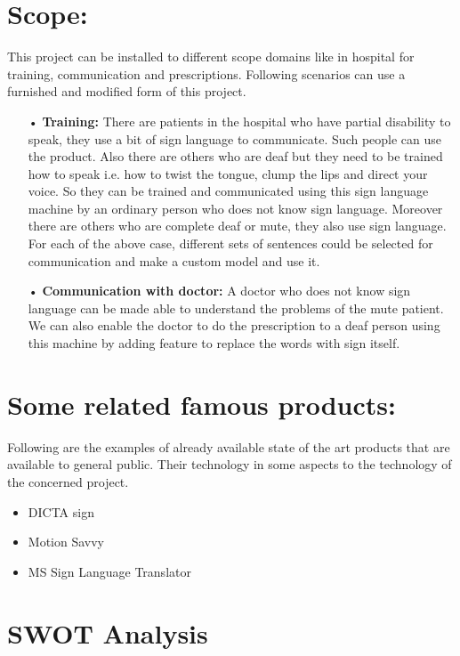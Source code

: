 \section{Scope:}
This project can be installed to different scope domains like in hospital for training, communication and prescriptions. Following scenarios can use a furnished and modified form of this project.
\begin{itemize}
\item[•]\textbf{	Training:}\newline
There are patients in the hospital who have partial disability to speak, they use a bit of sign language to communicate. Such people can use the product. Also there are others who are deaf but they need to be trained how to speak i.e. how to twist the tongue, clump the lips and direct your voice. So they can be trained and communicated using this sign language machine by an ordinary person who does not know sign language. Moreover there are others who are complete deaf or mute, they also use sign language. For each of the above case, different sets of sentences could be selected for communication and make a custom model and use it.


	

\item[•]\textbf{	Communication with doctor:}\newline 
A doctor who does not know sign language can be made able to understand the problems of the mute patient. We can also enable the doctor to do the prescription to a deaf person using this machine by adding feature to replace the words with sign itself.
\end{itemize}
\section{Some related famous products: }
Following are the examples of already available state of the art products that are available to general public. Their technology in some aspects to the technology of the concerned project.
\begin{itemize}
	\item DICTA sign  \cite{DICTAsign}
	\item Motion Savvy  \cite{MotionSavvy}
	\item MS Sign Language Translator \cite{MSSignLanguageTranslator}
\end{itemize}


\section{	SWOT Analysis }

